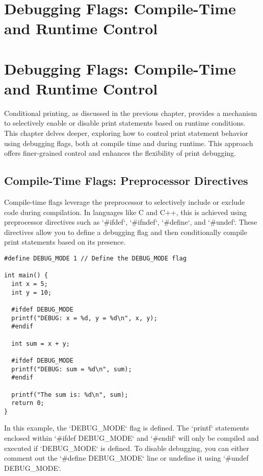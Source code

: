 \documentclass{article}
\begin{document}
{{{%
\newpage

\section*{Debugging Flags: Compile-Time and Runtime Control} %
\label{chapter-5-2-Debugging_Flags__Compile-Time_and_Runtim}

\section*{Debugging Flags: Compile-Time and Runtime Control}

Conditional printing, as discussed in the previous chapter, provides a mechanism to selectively enable or disable print statements based on runtime conditions. This chapter delves deeper, exploring how to control print statement behavior using debugging flags, both at compile time and during runtime. This approach offers finer-grained control and enhances the flexibility of print debugging.

\subsection*{Compile-Time Flags: Preprocessor Directives}

Compile-time flags leverage the preprocessor to selectively include or exclude code during compilation. In languages like C and C++, this is achieved using preprocessor directives such as `#ifdef`, `#ifndef`, `#define`, and `#undef`. These directives allow you to define a debugging flag and then conditionally compile print statements based on its presence.

\begin{verbatim}
#define DEBUG_MODE 1 // Define the DEBUG_MODE flag

int main() {
  int x = 5;
  int y = 10;

  #ifdef DEBUG_MODE
  printf("DEBUG: x = %d, y = %d\n", x, y);
  #endif

  int sum = x + y;

  #ifdef DEBUG_MODE
  printf("DEBUG: sum = %d\n", sum);
  #endif

  printf("The sum is: %d\n", sum);
  return 0;
}
\end{verbatim}

In this example, the `DEBUG_MODE` flag is defined. The `printf` statements enclosed within `#ifdef DEBUG_MODE` and `#endif` will only be compiled and executed if `DEBUG_MODE` is defined. To disable debugging, you can either comment out the `#define DEBUG_MODE` line or undefine it using `#undef DEBUG_MODE`.

}}}
\end{document}
